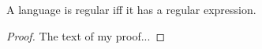 %

\begin{theorem}\label{thm:regular_iff_regexp}
  A language is regular iff it has a regular expression.
\end{theorem}
\begin{proof}
  The text of my proof...
\end{proof}
